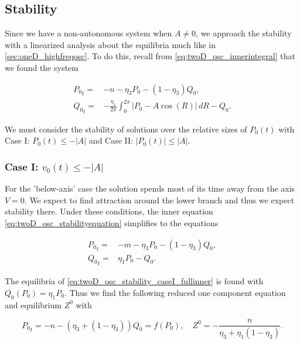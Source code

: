 \subsection{Stability}

Since we have a non-autonomous system when $A\not=0$, we approach the stability with a linearized analysis about the equilibria much like in \autoref{sec:oneD_highfreqosc}. To do this, recall from \eqref{eq:twoD_osc_innerintegral} that we found the system

\begin{equation}\label{eq:twoD_osc_stabilityequation}
\begin{aligned}
{P_0}_t =& -n -\eta_3 P_0-(1-\eta_3)Q_0,\\
{Q_0}_t =& -\frac{\eta_1}{2\pi}\int_0^{2\pi}|P_0-A\cos(R)|\, dR - Q_0.
\end{aligned}
\end{equation}

We must consider the stability of solutions over the relative sizes of $P_0(t)$ with Case I: $P_0(t)\le -|A|$ and Case II: $|P_0(t)|\le |A|$.

\subsubsection{Case I: $v_0(t)\le -|A|$}

For the 'below-axis' case the solution spends most of its time away from the axis $V=0$. We expect to find attraction around the lower branch and thus we expect stability there. Under these conditions, the inner equation \eqref{eq:twoD_osc_stabilityequation} simplifies to the equations

\begin{equation}\label{eq:twoD_osc_stability_caseI_fullinner}
\begin{aligned}
{P_0}_t =& -m -\eta_3 P_0-(1-\eta_3)Q_0,\\
{Q_0}_t =& \eta_1 P_0 - Q_0.
\end{aligned}
\end{equation}

The equilibria of \eqref{eq:twoD_osc_stability_caseI_fullinner} is found with $Q_0(P_0)=\eta_1 P_0$. Thus we find the following reduced one component equation and equilibrium $Z^0$ with

\begin{equation}\label{eq:twoD_osc_stability_caseI_red}
{P_0}_t = -n -(\eta_3 +(1-\eta_3))Q_0=f(P_0),\quad Z^0 = -\frac{n}{\eta_3+\eta_1(1-\eta_3)}.
\end{equation}

